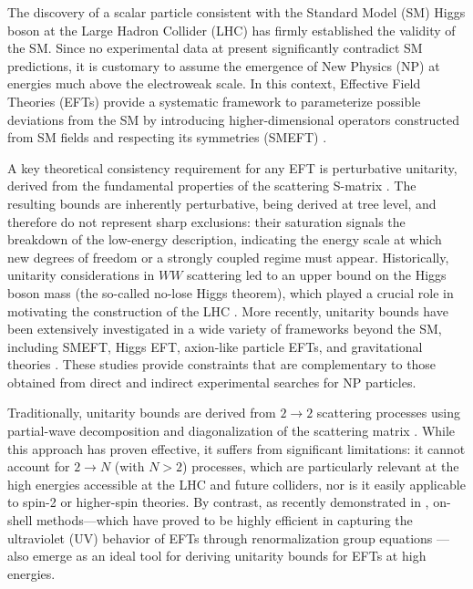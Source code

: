 \documentclass[
aps,
prd,
10pt,
twocolumn,
oneside,
preprintnumbers,
superscriptaddress,
amsmath,
amssymb,
nofootinbib,
flushbottom]{revtex4-2}
\begin{document}
The discovery of a scalar particle consistent with the Standard Model (SM) Higgs boson at the Large Hadron Collider (LHC) has firmly established the validity of the SM. Since no experimental data at present significantly contradict SM predictions, it is customary to assume the emergence of New Physics (NP) at energies much above the electroweak scale. In this context, Effective Field Theories (EFTs) provide a systematic framework to parameterize possible deviations from the SM by introducing higher-dimensional operators constructed from SM fields and respecting its symmetries (SMEFT) \cite{Buchmuller:1985jz,Grzadkowski:2010es,Brivio:2017vri,Isidori:2023pyp,Aebischer:2025qhh}. 

A key theoretical consistency requirement for any EFT is perturbative unitarity,
derived from the fundamental properties of the scattering S-matrix \cite{Jacob:1959at}. 
The resulting bounds are inherently perturbative, being derived at tree level, and
therefore do not represent sharp exclusions: their saturation signals the breakdown
of the low-energy description, indicating the energy scale at which new degrees of
freedom or a strongly coupled regime must appear.
Historically, unitarity considerations in $WW$ scattering led to an upper bound on the Higgs boson mass (the so-called no-lose Higgs theorem), which played a crucial role in motivating the construction of the LHC \cite{Lee:1977yc,Lee:1977eg}.
More recently, unitarity bounds have been extensively investigated in a wide variety of frameworks beyond the SM, including SMEFT, Higgs EFT, axion-like particle EFTs, and gravitational theories \cite{Gounaris:1994cm,Corbett:2014ora,Corbett:2017qgl,Cao:2023qks,Eboli:2026ccq,Degrande:2025uil,DiLuzio:2017chi,DiLuzio:2016sur,Mahmud:2024iyn,Allwicher:2021jkr,Cohen:2021ucp,Almeida:2020ylr,Cohen:2021gdw,Abu-Ajamieh:2020yqi,Brivio:2021fog,Falkowski:2019tft,Chang:2019vez,Alonso:2025ksv,Bresciani:2025ojh}. These studies provide constraints that are complementary to those obtained from direct and indirect experimental searches for NP particles.

Traditionally, unitarity bounds are derived from $2\to 2$ scattering processes using partial-wave decomposition and diagonalization of the scattering matrix \cite{Jacob:1959at}. While this approach has proven effective, it suffers from significant limitations: it cannot account for $2 \to N$ (with $N > 2$) processes, which are particularly relevant at the high energies accessible at the LHC and future colliders, nor is it easily applicable to spin-2 or higher-spin theories. 
By contrast, as recently demonstrated in \cite{Bresciani:2025toe}, on-shell methods---which have proved to be highly efficient in capturing the ultraviolet (UV) behavior of EFTs through renormalization group equations \cite{Caron-Huot:2016cwu,EliasMiro:2020tdv,Baratella:2020lzz,Jiang:2020mhe,Bern:2020ikv,Baratella:2020dvw,AccettulliHuber:2021uoa,EliasMiro:2021jgu,Baratella:2022nog,Machado:2022ozb,Bresciani:2023jsu,Bresciani:2024shu,Aebischer:2025zxg,Aebischer:2025ddl,Wu:2025qto}---also emerge as an ideal tool for deriving unitarity bounds for EFTs at high energies.
\end{document}
